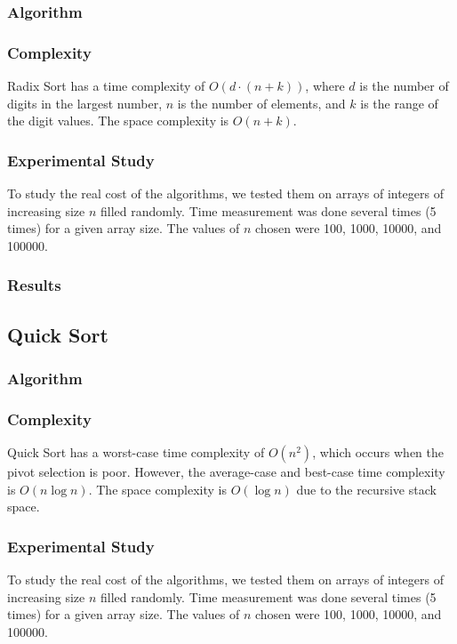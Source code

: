 \documentclass{article}
\begin{document}
\subsubsection{Algorithm}

\subsubsection{Complexity}
Radix Sort has a time complexity of $O(d \cdot (n + k))$, where $d$ is the number of digits in the largest number, $n$ is the number of elements, and $k$ is the range of the digit values. The space complexity is $O(n + k)$.

\subsubsection{Experimental Study}
To study the real cost of the algorithms, we tested them on arrays of integers of increasing size $n$ filled randomly. Time measurement was done several times (5 times) for a given array size. The values of $n$ chosen were 100, 1000, 10000, and 100000.

\subsubsection{Results}
\begin{figure}[ht]
\end{figure}


\subsection{Quick Sort}

\subsubsection{Algorithm}

\subsubsection{Complexity}
Quick Sort has a worst-case time complexity of $O(n^2)$, which occurs when the pivot selection is poor. However, the average-case and best-case time complexity is $O(n \log n)$. The space complexity is $O(\log n)$ due to the recursive stack space.

\subsubsection{Experimental Study}
To study the real cost of the algorithms, we tested them on arrays of integers of increasing size $n$ filled randomly. Time measurement was done several times (5 times) for a given array size. The values of $n$ chosen were 100, 1000, 10000, and 100000.
\end{document}
